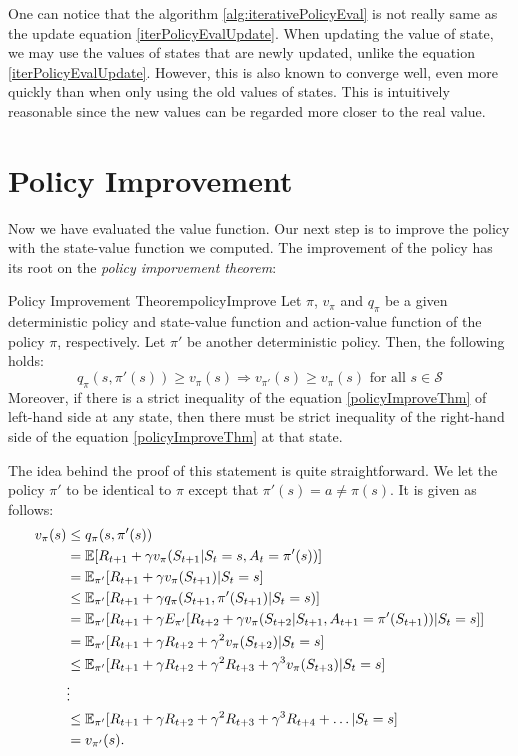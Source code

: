 \documentclass[../../main.tex]{subfiles}
\begin{document}
    One can notice that the algorithm \ref{alg:iterativePolicyEval} is not really same as the update equation \ref{iterPolicyEvalUpdate}.
    When updating the value of state, we may use the values of states that are newly updated, unlike the equation \ref{iterPolicyEvalUpdate}.
    However, this is also known to converge well, even more quickly than when only using the old values of states.
    This is intuitively reasonable since the new values can be regarded more closer to the real value.

\section{Policy Improvement}
    Now we have evaluated the value function. Our next step is to improve the policy with the state-value function we computed.
    The improvement of the policy has its root on the \emph{policy imporvement theorem}:
    \begin{thm}{Policy Improvement Theorem}{policyImprove}
        Let $\pi$, $v_\pi$ and $q_\pi$ be a given deterministic policy and state-value function and action-value function
        of the policy $\pi$, respectively. Let $\pi'$ be another deterministic policy. Then, the following holds:
        \begin{equation}
            q_\pi(s,\pi'(s)) \geq v_\pi(s) \Rightarrow v_{\pi'}(s) \geq v_\pi(s) \text{ for all } s \in \mathcal{S} \label{policyImproveThm}
        \end{equation}
        Moreover, if there is a strict inequality of the equation \ref{policyImproveThm} of left-hand side at any state, then there must be strict inequality of the right-hand side of the equation \ref{policyImproveThm} at that state.
    \end{thm}
    The idea behind the proof of this statement is quite straightforward.
    We let the policy $\pi'$ to be identical to $\pi$ except that $\pi'(s) = a \neq \pi(s)$. It is given as follows:
    \begin{align*}
        v_\pi(s) &\leq q_\pi(s,\pi'(s)) \\
        &=\mathbb{E}[R_{t+1} + \gamma v_\pi(S_{t+1} | S_t = s, A_t = \pi'(s))] \\
        &=\mathbb{E}_{\pi'}[R_{t+1} + \gamma v_\pi(S_{t+1})|S_t=s] \\
        &\leq \mathbb{E}_{\pi'}[R_{t+1} + \gamma q_\pi(S_{t+1},\pi'(S_{t+1})|S_t=s)] \\
        &=\mathbb{E}_{\pi'}[R_{t+1} + \gamma E_{\pi'}[R_{t+2} + \gamma v_\pi(S_{t+2}|S_{t+1},A_{t+1}=\pi'(S_{t+1}))|S_t=s]] \\
        &=\mathbb{E}_{\pi'}[R_{t+1}+\gamma R_{t+2} + \gamma^2v_\pi(S_{t+2})|S_t=s] \\
        &\leq\mathbb{E}_{\pi'}[R_{t+1}+\gamma R_{t+2} + \gamma^2R_{t+3}+\gamma^3v_\pi(S_{t+3})|S_t=s] \\
        &\vdots\\
        &\leq\mathbb{E}_{\pi'}[R_{t+1}+\gamma R_{t+2} + \gamma^2R_{t+3}+\gamma^3R_{t+4} + \dots |S_t=s] \\
        &=v_{\pi'}(s).
    \end{align*}
\end{document}

